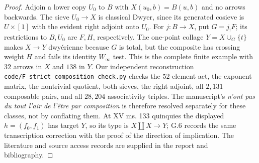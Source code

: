 \begin{proof}
Adjoin a lower copy $U_0$ to $B$ with
$X(u_0,b)=B(u,b)$ and no arrows backwards. The sieve
$U_0\to X$ is classical Dwyer, since its generated cosieve
is $U\times[1]$ with the evident right adjoint onto $U_0$.
For $j:B\to X$, put $G=j_!F$; its restrictions to $B,U_0$
are $F,H$, respectively. The one-point collage $Y=X\cup_G\{t\}$
makes $X\to Y$ dwy\'erienne because $G$ is total, but the
composite has crossing weight $H$ and fails its identity
$W_\infty$ test. This is the complete finite example with
$32$ arrows in $X$ and $138$ in $Y$.
Our independent reconstruction
\texttt{code/F\_strict\_composition\_check.py} checks the
$52$-element act, the exponent matrix, the nontrivial quotient,
both sieves, the right adjoint, all $2{,}131$ composable pairs,
and all $28{,}204$ associativity triples.
The manuscript's \emph{n'ont pas du tout l'air de l'\^etre par
composition} is therefore resolved separately for these classes,
not by conflating them. At XV ms. 133 quinquies the displayed
$h=(f_0,f_1)$ has target $Y$, so its type is $X\amalg X\to Y$;
G.6 records the same transcription correction with the proof
of the direction of implication. The literature and source
access records are supplied in the report and bibliography.
\end{proof}

